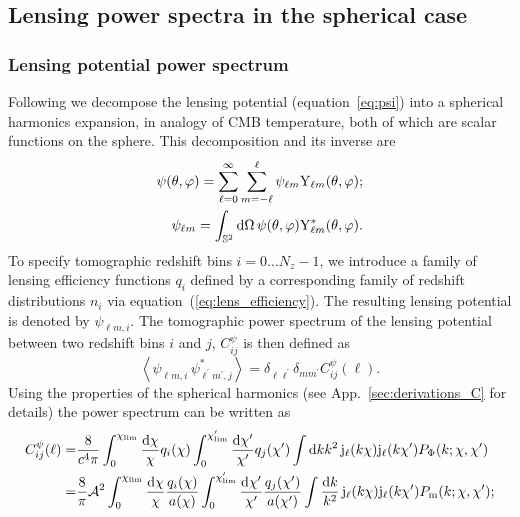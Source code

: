 \documentclass[fleqn,usenatbib]{mnras} %
\newcommand{\pref}{{\cal A}}
\begin{document}
\subsection{Lensing power spectra in the spherical case}

\subsubsection{Lensing potential power spectrum}

Following \cite{2000PhRvD..62d3007H} we decompose the lensing potential (equation~\ref{eq:psi}) into a spherical harmonics expansion, in analogy of CMB
temperature, both of which are scalar functions on the sphere. This
decomposition and its inverse are
%
%
\begin{align}
  \psi(\theta, \varphi) = \sum_{\ell=0}^\infty \sum_{m=-\ell}^\ell \psi_{\ell m} {\rm Y}_{\ell m}(\theta, \varphi);
    \label{eq:psi_harm_exp}
    \\
  \psi_{\ell m} = \int_{\mathbb{S}^2} {\rm d} \Omega \, \psi(\theta, \varphi) {\rm Y}^\ast_{\ell m}(\theta, \varphi).
  \label{eq:psi_harm_exp_inv}
\end{align}
%
To specify tomographic redshift bins $i=0\ldots N_z-1$, we introduce a family
of lensing efficiency functions $q_i$ defined by a corresponding family of
redshift distributions $n_i$ via equation~(\ref{eq:lens_efficiency}). The resulting
lensing potential is denoted by $\psi_{\ell m, i}$. The tomographic power
spectrum of the lensing potential between two redshift bins $i$ and $j$,
$C_{ij}^\psi$ \citep{pee80} is then defined as
%
\begin{equation}
  \left\langle \psi^{}_{\ell m, i} \, \psi^\ast_{\ell^\prime m^\prime, j} \right\rangle
    = \delta_{\ell \ell^\prime} \delta_{m m^\prime} C^\psi_{ij}(\ell) .
  \label{eq:C_ell_psi}
\end{equation}
%
Using the properties of the spherical harmonics (see
App.~\ref{sec:derivations_C} for details) the power spectrum can be written as
%
\begin{align}
  C_{ij}^\psi(\ell) = & \frac 8 {c^4 \pi} 
  \int_0^{\chi_{\rm lim}} \frac{{\rm d}\chi}{\chi} q_i(\chi)
  \int_0^{\chi^\prime_{\rm lim}} \frac{{\rm d}\chi^\prime}{\chi^\prime} q_j(\chi^\prime)
  \int {\rm d} k k^2 \, {\rm j}_\ell(k \chi) {\rm j}_\ell(k \chi^\prime) P_\Phi(k; \chi, \chi^\prime)
  \label{eq:C_ell_phi_Pphi} \\
  = & \frac 8 \pi \pref^2
  \int_0^{\chi_{\rm lim}} \frac{{\rm d}\chi}{\chi} \frac{q_i(\chi)}{a(\chi)}
  \int_0^{\chi^\prime_{\rm lim}} \frac{{\rm d}\chi^\prime}{\chi^\prime} \frac{q_j(\chi^\prime)}{a(\chi^\prime)}
  \int \frac{{\rm d} k}{k^2} \, {\rm j}_\ell(k \chi) {\rm j}_\ell(k \chi^\prime) P_{\rm m}(k; \chi, \chi^\prime) ;
  \label{eq:C_ell_phi_Pm}
\end{align}
\end{document}

